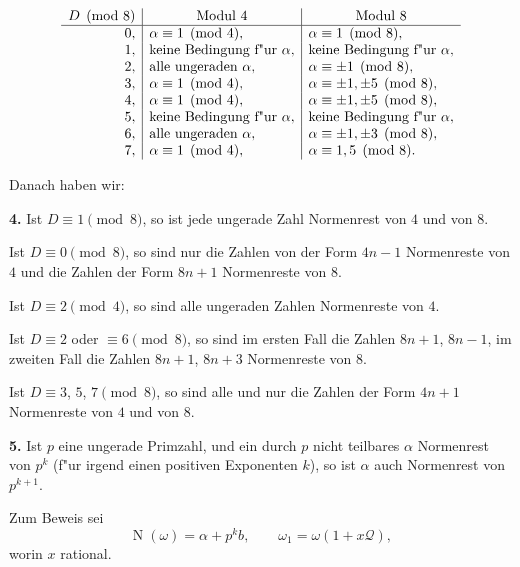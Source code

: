 \documentclass[11pt,a4paper]{article}
\theoremstyle{plain}
\DeclareMathOperator{\Norm}{N}
\begin{document}
\newpage
\setcounter{page}{393}

\[
\begin{array}{r|l|l}
\multicolumn{1}{c|}{D \pmod{8}} & \multicolumn{1}{c|}{\text{Modul }4} & \multicolumn{1}{c}{\text{Modul }8}\\
\hline
0, & \alpha \equiv 1 \pmod{4}, & \alpha \equiv 1 \pmod{8},\\
1, & \text{keine Bedingung f"{u}r }\alpha, & \text{keine Bedingung f"{u}r }\alpha,\\
2, & \text{alle ungeraden }\alpha, & \alpha \equiv \pm 1 \pmod{8},\\
3, & \alpha \equiv 1 \pmod{4}, & \alpha \equiv \pm 1, \pm 5 \pmod{8},\\
4, & \alpha \equiv 1 \pmod{4}, & \alpha \equiv \pm 1, \pm 5 \pmod{8},\\
5, & \text{keine Bedingung f"{u}r }\alpha, & \text{keine Bedingung f"{u}r }\alpha,\\
6, & \text{alle ungeraden }\alpha, & \alpha \equiv \pm 1, \pm 3 \pmod{8},\\
7, & \alpha \equiv 1 \pmod{4}, & \alpha \equiv 1, 5 \pmod{8}.
\end{array}
\]

\newpage
\setcounter{page}{394}

Danach haben wir:

\smallskip

\textbf{4.} Ist $D \equiv 1 \pmod{8}$, so ist jede ungerade Zahl Normenrest von $4$ und von $8$.

Ist $D \equiv 0 \pmod{8}$, so sind nur die Zahlen von der Form $4n - 1$ Normenreste von $4$ und die Zahlen der Form $8n + 1$ Normenreste von $8$.

Ist $D \equiv 2 \pmod{4}$, so sind alle ungeraden Zahlen Normenreste von $4$.

Ist $D \equiv 2$ oder $\equiv 6 \pmod{8}$, so sind im ersten Fall die Zahlen $8n + 1$, $8n - 1$, im zweiten Fall die Zahlen $8n + 1$, $8n + 3$ Normenreste von $8$.

Ist $D \equiv 3$, $5$, $7 \pmod{8}$, so sind alle und nur die Zahlen der Form $4n + 1$ Normenreste von $4$ und von $8$.

\smallskip

\textbf{5.} Ist $p$ eine ungerade Primzahl, und ein durch $p$ nicht teilbares $\alpha$ Normenrest von $p^k$ (f"{u}r irgend einen positiven Exponenten $k$), so ist $\alpha$ auch Normenrest von $p^{k+1}$.

Zum Beweis sei
\[
\Norm(\omega) = \alpha + p^k b, \qquad \omega_1 = \omega(1 + x\mathcal{Q}),
\]
worin $x$ rational.
\end{document}
